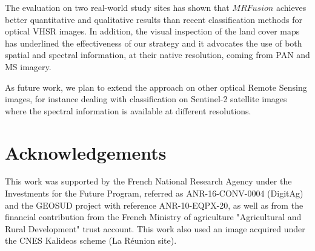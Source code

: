 \documentclass[journal]{IEEEtran}
\newcommand{\method}{$MRFusion$}
\begin{document}
The evaluation on two real-world study sites has shown that \method{} achieves better quantitative and qualitative results than recent classification methods for optical VHSR images. In addition, the visual inspection of the land cover maps has underlined the effectiveness of our strategy and it advocates the use of both spatial and spectral information, at their native resolution, coming from PAN and MS imagery.

As future work, we plan to extend the approach on other optical Remote Sensing images, for instance dealing with classification on Sentinel-2 satellite images where the spectral information is available at different resolutions.


\section{Acknowledgements}
This work was supported by the French National Research Agency under the Investments for the Future Program, referred as ANR-16-CONV-0004 (DigitAg) and the GEOSUD project with reference ANR-10-EQPX-20, as well as from the financial contribution from the French Ministry of agriculture "Agricultural and Rural Development" trust account. This work also used an image acquired under the CNES Kalideos scheme (La R\'{e}union site).

%


\end{document}
